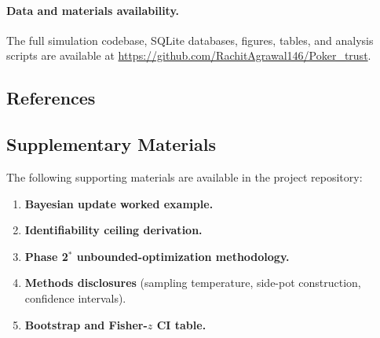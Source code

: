 \documentclass[10pt,twocolumn,letterpaper]{article}
\begin{document}
\paragraph*{Data and materials availability.}
The full simulation codebase, SQLite databases, figures, tables,
and analysis scripts are available at
\url{https://github.com/RachitAgrawal146/Poker_trust}.

\subsection*{References}
\footnotesize


\subsection*{Supplementary Materials}
The following supporting materials are available in the project
repository:
\footnotesize\raggedright
\begin{enumerate}\setlength{\itemsep}{2pt}\setlength{\parskip}{0pt}\setlength{\leftmargini}{1.5em}
  \item \textbf{Bayesian update worked example.} 
  \item \textbf{Identifiability ceiling derivation.} 
  \item \textbf{Phase 2$^{*}$ unbounded-optimization methodology.} 
  \item \textbf{Methods disclosures} (sampling temperature, side-pot construction, confidence intervals). 
  \item \textbf{Bootstrap and Fisher-$z$ CI table.} 
\end{enumerate}
\end{document}

